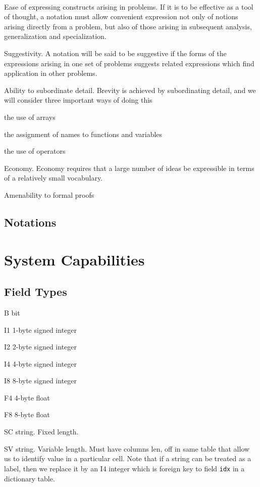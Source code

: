 \documentclass{report}
\begin{document}
{\tt 
\be
\item Ease of expressing constructs arising in problems. If it is to be
effective as a tool of thought, a notation must allow convenient
expression not only of notions arising directly from a problem, but also
of those arising in subsequent analysis, generalization and
specialization.

\item Suggestivity. A notation will be said to be suggestive if the
forms of the expressions arising in one set of problems suggests related
expressions which find application in other problems.

\item Ability to subordinate detail. Brevity is achieved by
subordinating detail, and we will consider three important ways of doing
this
\bi
\item the use of arrays
\item the assignment of names to functions and variables
\item the use of operators
\ei

\item Economy. Economy requires that a large number of ideas be
expressible in terms of a relatively small vocabulary. 

\item Amenability to formal proofs

\ee
}


\subsection{Notations}


\section{System Capabilities}

\subsection{Field Types}
\label{Field_Types}
\bd
\item [B]  bit 
\item [I1] 1-byte signed integer
\item [I2] 2-byte signed integer
\item [I4] 4-byte signed integer
\item [I8] 8-byte signed integer
\item [F4] 4-byte float
\item [F8] 8-byte float
\item [SC]  string. Fixed length.
\item [SV]  string. Variable length. Must have columns len, off in same
table that allow us to identify value in a particular cell.
\ed
Note that if a string can be treated as a label, then we replace it
by an I4 integer which is foreign key to field {\tt idx} in a dictionary table. 
\end{document}
